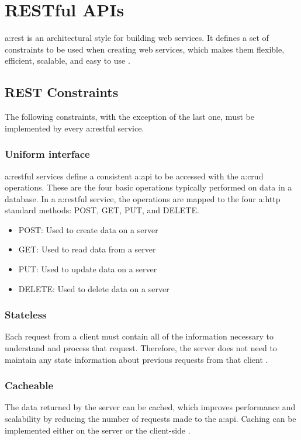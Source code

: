 \section{RESTful APIs}

\gls{a:rest} is an architectural style for building web services. It defines a set of constraints to be used when creating web services, which makes them flexible, efficient, scalable, and easy to use \cite{RESTGuidelines}.

\subsection{REST Constraints}
The following constraints, with the exception of the last one, must be implemented by every \gls{a:rest}ful service.

\subsubsection{Uniform interface}
\gls{a:rest}ful services define a consistent \gls{a:api} to be accessed with the \gls{a:crud} operations. These are the four basic operations typically performed on data in a database. In a \gls{a:rest}ful service, the operations are mapped to the four \gls{a:http} standard methods: POST, GET, PUT, and DELETE.
\begin{itemize}
\item POST: Used to create data on a server
\item GET: Used to read data from a server
\item PUT: Used to update data on a server
\item DELETE: Used to delete data on a server
\end{itemize}
\subsubsection{Stateless}
Each request from a client must contain all of the information necessary to understand and process that request. Therefore, the server does not need to maintain any state information about previous requests from that client \cite{RESTGuidelines}.
\subsubsection{Cacheable}
The data returned by the server can be cached, which improves performance and scalability by reducing the number of requests made to the \gls{a:api}. Caching can be implemented either on the server or the client-side \cite{RESTGuidelines}.
